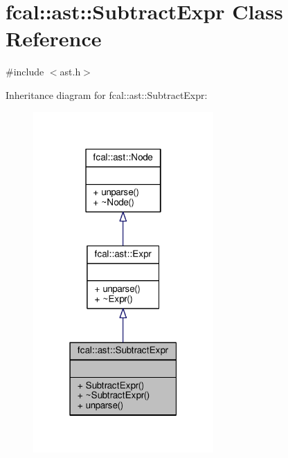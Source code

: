 \hypertarget{classfcal_1_1ast_1_1SubtractExpr}{}\section{fcal\+:\+:ast\+:\+:Subtract\+Expr Class Reference}
\label{classfcal_1_1ast_1_1SubtractExpr}


{\ttfamily \#include $<$ast.\+h$>$}



Inheritance diagram for fcal\+:\+:ast\+:\+:Subtract\+Expr\+:
\nopagebreak
\begin{figure}[H]
\begin{center}
\leavevmode
\includegraphics[width=195pt]{classfcal_1_1ast_1_1SubtractExpr__inherit__graph}
\end{center}
\end{figure}


